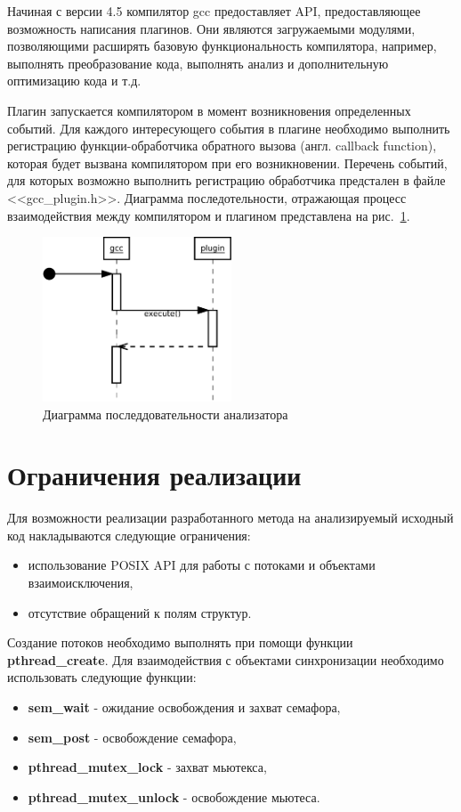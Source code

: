 Начиная с версии 4.5 компилятор gcc предоставляет API, предоставляющее возможность написания плагинов. Они являются загружаемыми модулями, позволяющими расширять базовую функциональность компилятора, например, выполнять преобразование кода, выполнять анализ и дополнительную оптимизацию кода и т.д.

Плагин запускается компилятором в момент возникновения определенных событий. Для каждого интересующего события в плагине необходимо выполнить регистрацию функции-обработчика обратного вызова (англ. callback function), которая будет вызвана компилятором при его возникновении. Перечень событий, для которых возможно выполнить регистрацию обработчика предстален в файле <<gcc\_plugin.h>>. Диаграмма последотельности, отражающая процесс взаимодействия между компилятором и плагином представлена на рис.~\ref{fig:sequence}.

\begin{figure}
  \centering
  \includegraphics[width=0.5\textwidth]{inc/dia/sequence}
  \caption{Диаграмма последдовательности анализатора}
  \label{fig:sequence}
\end{figure}

\section{Ограничения реализации}

Для возможности реализации разработанного метода на анализируемый исходный код накладываются следующие ограничения:
\begin{itemize}
  \item использование POSIX API для работы с потоками и объектами взаимоисключения,
  \item отсутствие обращений к полям структур.
\end{itemize}

Создание потоков необходимо выполнять при помощи функции \textbf{pthread\_create}. Для взаимодействия с объектами синхронизации необходимо использовать следующие функции:
\begin{itemize}
  \item \textbf{sem\_wait} - ожидание освобождения и захват семафора,
  \item \textbf{sem\_post} - освобождение семафора,
  \item \textbf{pthread\_mutex\_lock} - захват мьютекса,
  \item \textbf{pthread\_mutex\_unlock} - освобождение мьютеса.
\end{itemize}


